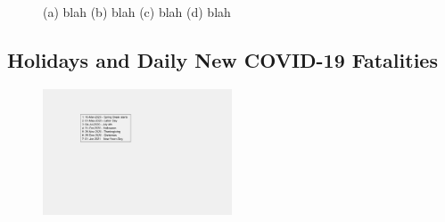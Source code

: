 \documentclass[]{article}
\begin{document}
\begin{figure}
	\caption{(a) blah (b) blah (c) blah (d) blah}
	\label{fig:foobar}
\end{figure}

\FloatBarrier
\vspace{5mm}

\subsection{Holidays and Daily New COVID-19 Fatalities}

\begin{figure}[!h]
	\centering
	\includegraphics[width=0.50\textwidth]{legends/holiday_legend.png}
	\caption{}
	\label{fig:legends/holiday_legendLabel}
\end{figure}
\end{document}
